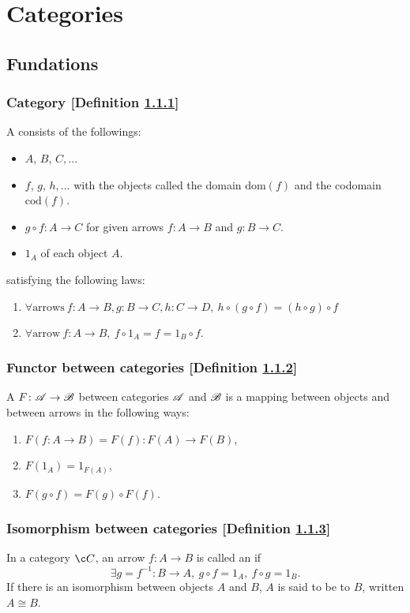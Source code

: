 \newcommand{\sets}{\mathbf{Sets}}
\section{Categories\cite{awodey}}
\subsection{Fundations}
\subsubsection{Category [Definition \ref{category}]}\label{category}
A  consists of the followings:
\begin{itemize}
\item {} $A$, $B$, $C, \dotsc$
\item {} $f$, $g$, $h, \dotsc$ with the objects called the domain $\mathrm{dom}(f)$ and the codomain $\mathrm{cod}(f)$.
\item {} $g \circ f \colon A \to C$ for given arrows $f \colon A \to B$ and $g \colon B \to C$.
\item {} $1_A$ of each object $A$.
\end{itemize}
satisfying the following laws:
\begin{enumerate}
\item $\forall \text{arrows}\ f \colon A \to B, g \colon B \to C, h \colon C \to D,\ h \circ (g \circ f) = (h \circ g) \circ f$
\item $\forall \text{arrow}\ f \colon A \to B,\ f \circ 1_A = f = 1_B \circ f$.
\end{enumerate}

\subsubsection{Functor between categories [Definition \ref{functor-between-categories}]}\label{functor-between-categories}
A  $F\colon \mathscr{A} \to \mathscr{B}$ between categories $\mathscr{A}$ and $\mathscr{B}$ is a mapping between objects and between arrows in the following ways:
\begin{enumerate}
\item $F(f\colon A \to B) = F(f) \colon F(A) \to F(B)$,
\item $F(1_A) = 1_{F(A)}$,
\item $F(g \circ f) = F(g) \circ F(f)$.    
\end{enumerate}

\subsubsection{Isomorphism between categories [Definition \ref{isomorphism-between-categories}]}\label{isomorphism-between-categories}
In a category $\c C$, an arrow $f \colon A \to B$ is called an  if
\[
\exists g = f^{-1} \colon B \to A,\ g \circ f = 1_A,\ f \circ g = 1_B.
\]
If there is an isomorphism between objects $A$ and $B$, $A$ is said to be  to $B$, written $A \cong B$.